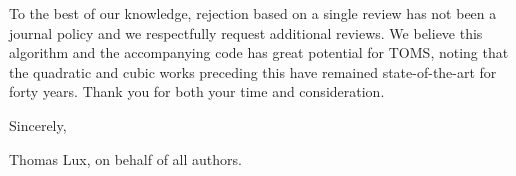 \bigskip

To the best of our knowledge, rejection based on a single review has not been a journal policy and we respectfully request additional reviews. We believe this algorithm and the accompanying code has great potential for TOMS, noting that the quadratic and cubic works preceding this have remained state-of-the-art for forty years. Thank you for both your time and consideration.

Sincerely,

Thomas Lux, on behalf of all authors.

\bye


